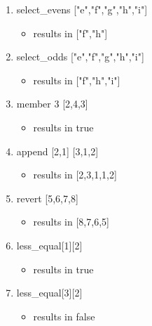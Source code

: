 \documentclass{article}
\theoremstyle{theorem}
\theoremstyle{definition}
\theoremstyle{remark}
\begin{document}
   \begin{enumerate}

\item select\_evens ["e","f","g","h","i"]
\begin{itemize}
\item results in ["f","h"]
\end{itemize}
\item select\_odds ["e","f","g","h","i"] 
\begin{itemize}
\item results in ["f","h","i"]
\end{itemize}
\item member 3 [2,4,3]
\begin{itemize}
\item results in true
\end{itemize}
\item append [2,1] [3,1,2]
\begin{itemize}
\item results in [2,3,1,1,2]
\end{itemize}
\item revert [5,6,7,8]
\begin{itemize}
\item results in [8,7,6,5]
\end{itemize}
\item less\_equal[1][2]
\begin{itemize}
\item results in true
\end{itemize}
\item less\_equal[3][2]
\begin{itemize}
\item results in false
\end{itemize}

\end{enumerate}
\end{document}
